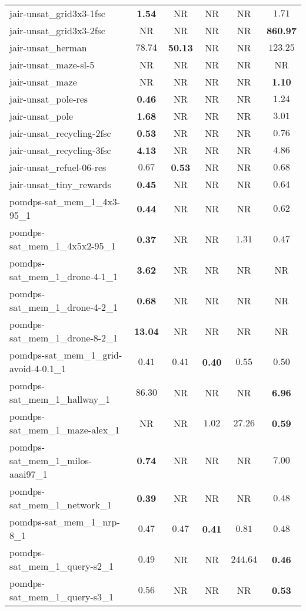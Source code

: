 \begin{tabular}{lccccc}
jair-unsat\_grid3x3-1fsc & \textbf{1.54} & NR & NR & NR & $1.71$ \\
jair-unsat\_grid3x3-2fsc & NR & NR & NR & NR & \textbf{860.97} \\
jair-unsat\_herman & $78.74$ & \textbf{50.13} & NR & NR & $123.25$ \\
jair-unsat\_maze-sl-5 & NR & NR & NR & NR & NR \\
jair-unsat\_maze & NR & NR & NR & NR & \textbf{1.10} \\
jair-unsat\_pole-res & \textbf{0.46} & NR & NR & NR & $1.24$ \\
jair-unsat\_pole & \textbf{1.68} & NR & NR & NR & $3.01$ \\
jair-unsat\_recycling-2fsc & \textbf{0.53} & NR & NR & NR & $0.76$ \\
jair-unsat\_recycling-3fsc & \textbf{4.13} & NR & NR & NR & $4.86$ \\
jair-unsat\_refuel-06-res & $0.67$ & \textbf{0.53} & NR & NR & $0.68$ \\
jair-unsat\_tiny\_rewards & \textbf{0.45} & NR & NR & NR & $0.64$ \\
pomdps-sat\_mem\_1\_4x3-95\_1 & \textbf{0.44} & NR & NR & NR & $0.62$ \\
pomdps-sat\_mem\_1\_4x5x2-95\_1 & \textbf{0.37} & NR & NR & $1.31$ & $0.47$ \\
pomdps-sat\_mem\_1\_drone-4-1\_1 & \textbf{3.62} & NR & NR & NR & NR \\
pomdps-sat\_mem\_1\_drone-4-2\_1 & \textbf{0.68} & NR & NR & NR & NR \\
pomdps-sat\_mem\_1\_drone-8-2\_1 & \textbf{13.04} & NR & NR & NR & NR \\
pomdps-sat\_mem\_1\_grid-avoid-4-0.1\_1 & $0.41$ & $0.41$ & \textbf{0.40} & $0.55$ & $0.50$ \\
pomdps-sat\_mem\_1\_hallway\_1 & $86.30$ & NR & NR & NR & \textbf{6.96} \\
pomdps-sat\_mem\_1\_maze-alex\_1 & NR & NR & $1.02$ & $27.26$ & \textbf{0.59} \\
pomdps-sat\_mem\_1\_milos-aaai97\_1 & \textbf{0.74} & NR & NR & NR & $7.00$ \\
pomdps-sat\_mem\_1\_network\_1 & \textbf{0.39} & NR & NR & NR & $0.48$ \\
pomdps-sat\_mem\_1\_nrp-8\_1 & $0.47$ & $0.47$ & \textbf{0.41} & $0.81$ & $0.48$ \\
pomdps-sat\_mem\_1\_query-s2\_1 & $0.49$ & NR & NR & $244.64$ & \textbf{0.46} \\
pomdps-sat\_mem\_1\_query-s3\_1 & $0.56$ & NR & NR & NR & \textbf{0.53} \\

\end{tabular}
